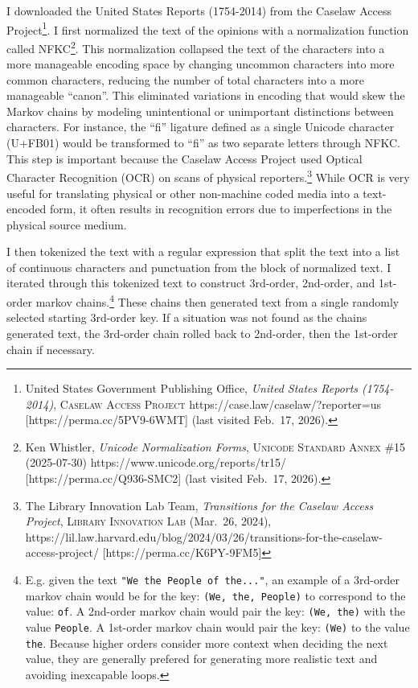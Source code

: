 \documentclass[
]{article}
\begin{document}
I downloaded the United States Reports (1754-2014) from the Caselaw
Access Project\footnote{United States Government Publishing Office,
  \emph{United States Reports (1754-2014)}, \textsc{Caselaw Access
  Project} https://case.law/caselaw/?reporter=us
  {[}https://perma.cc/5PV9-6WMT{]} (last visited Feb.~17, 2026).}. I
first normalized the text of the opinions with a normalization function
called NFKC\footnote{Ken Whistler, \emph{Unicode Normalization Forms},
  \textsc{Unicode Standard Annex \#15} (2025-07-30)
  https://www.unicode.org/reports/tr15/ {[}https://perma.cc/Q936-SMC2{]}
  (last visited Feb.~17, 2026).}. This normalization collapsed the text
of the characters into a more manageable encoding space by changing
uncommon characters into more common characters, reducing the number of
total characters into a more manageable ``canon''. This eliminated
variations in encoding that would skew the Markov chains by modeling
unintentional or unimportant distinctions between characters. For
instance, the ``ﬁ'' ligature defined as a single Unicode character
(U+FB01) would be transformed to ``fi'' as two separate letters through
NFKC. This step is important because the Caselaw Access Project used
Optical Character Recognition (OCR) on scans of physical
reporters.\footnote{The Library Innovation Lab Team, \emph{Transitions
  for the Caselaw Access Project}, \textsc{Library Innovation Lab}
  (Mar.~26, 2024),
  https://lil.law.harvard.edu/blog/2024/03/26/transitions-for-the-caselaw-access-project/
  {[}https://perma.cc/K6PY-9FM5{]}} While OCR is very useful for
translating physical or other non-machine coded media into a
text-encoded form, it often results in recognition errors due to
imperfections in the physical source medium.

I then tokenized the text with a regular expression that split the text
into a list of continuous characters and punctuation from the block of
normalized text. I iterated through this tokenized text to construct
3rd-order, 2nd-order, and 1st-order markov chains.\footnote{E.g. given
  the text \texttt{"We\ the\ People\ of\ the..."}, an example of a
  3rd-order markov chain would be for the key:
  \texttt{(\textquotesingle{}We\textquotesingle{},\ \textquotesingle{}the\textquotesingle{},\ \textquotesingle{}People)}
  to correspond to the value:
  \texttt{\textquotesingle{}of\textquotesingle{}}. A 2nd-order markov
  chain would pair the key:
  \texttt{(\textquotesingle{}We\textquotesingle{},\ \textquotesingle{}the\textquotesingle{})}
  with the value \texttt{\textquotesingle{}People\textquotesingle{}}. A
  1st-order markov chain would pair the key:
  \texttt{(\textquotesingle{}We\textquotesingle{})} to the value
  \texttt{\textquotesingle{}the\textquotesingle{}}. Because higher
  orders consider more context when deciding the next value, they are
  generally prefered for generating more realistic text and avoiding
  inexcapable loops.} These chains then generated text from a single
randomly selected starting 3rd-order key. If a situation was not found
as the chains generated text, the 3rd-order chain rolled back to
2nd-order, then the 1st-order chain if necessary.
\end{document}
